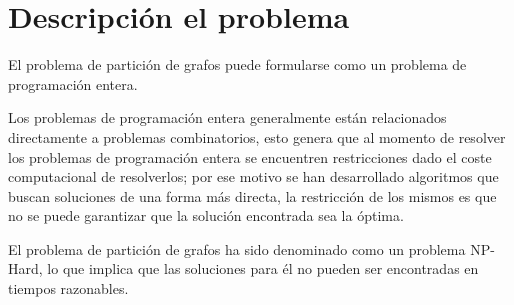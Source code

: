 \section{Descripción el problema}
El problema de partición de grafos puede formularse como un problema de programación entera. 

Los problemas de programación entera generalmente están relacionados directamente a problemas combinatorios, esto genera que al momento de resolver los problemas de programación entera se encuentren restricciones dado el coste computacional de resolverlos; por ese motivo se han desarrollado algoritmos que buscan soluciones de una forma más directa, la restricción de los mismos es que no se puede garantizar que la solución encontrada sea la óptima. 

El problema de partición de grafos ha sido denominado como un problema NP-Hard\cite{Karypis}, lo que implica que las soluciones para él no pueden ser encontradas en tiempos razonables.

